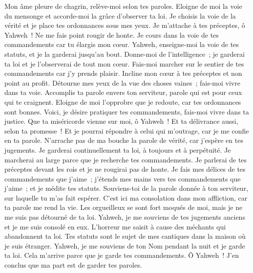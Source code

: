 \begin{multicols}{2}
Mon âme pleure de chagrin, relève-moi selon tes paroles.
Eloigne de moi la voie du mensonge et accorde-moi la grâce d'observer ta loi.
Je choisis la voie de la vérité et je place tes ordonnances sous mes yeux.
Je m'attache à tes préceptes, ô Yahweh~! Ne me fais point rougir de honte.
Je cours dans la voie de tes commandements car tu élargis mon cœur.
 Yahweh, enseigne-moi la voie de tes statuts, et je la garderai jusqu'au bout.
Donne-moi de l'intelligence~; je garderai ta loi et je l'observerai de tout mon cœur.
Fais-moi marcher sur le sentier de tes commandements car j'y prends plaisir.
Incline mon cœur à tes préceptes et non point au profit.
Détourne mes yeux de la vue des choses vaines~; fais-moi vivre dans ta voie.
Accomplis ta parole envers ton serviteur, parole qui est pour ceux qui te craignent.
Eloigne de moi l'opprobre que je redoute, car tes ordonnances sont bonnes.
Voici, je désire pratiquer tes commandements, fais-moi vivre dans ta justice.
 Que ta miséricorde vienne sur moi, ô Yahweh~! Et ta délivrance aussi, selon ta promesse~!
Et je pourrai répondre à celui qui m'outrage, car je me confie en ta parole.
N'arrache pas de ma bouche la parole de vérité, car j'espère en tes jugements.
Je garderai continuellement ta loi, à toujours et à perpétuité.
Je marcherai au large parce que je recherche tes commandements.
Je parlerai de tes préceptes devant les rois et je ne rougirai pas de honte.
Je fais mes délices de tes commandements que j'aime~;
j'étends mes mains vers tes commandements que j'aime~; et je médite tes statuts.
 Souviens-toi de la parole donnée à ton serviteur, sur laquelle tu m'as fait espérer.
C'est ici ma consolation dans mon affliction, car ta parole me rend la vie.
Les orgueilleux se sont fort moqués de moi, mais je ne me suis pas détourné de ta loi.
Yahweh, je me souviens de tes jugements anciens et je me suis consolé en eux.
L'horreur me saisit à cause des méchants qui abandonnent ta loi.
Tes statuts sont le sujet de mes cantiques dans la maison où je suis étranger.
Yahweh, je me souviens de ton Nom pendant la nuit et je garde ta loi.
Cela m'arrive parce que je garde tes commandements.
 Ô Yahweh~! J'en conclus que ma part est de garder tes paroles.

\end{multicols}
